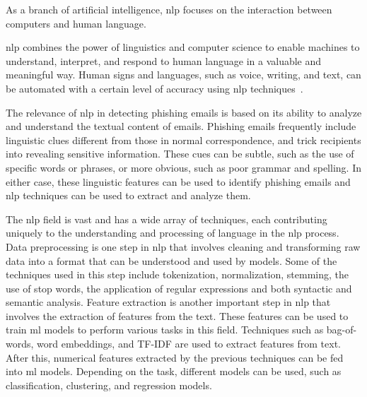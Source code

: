 
As a branch of artificial intelligence, \ac{nlp} focuses on the interaction between computers and human language.

\ac{nlp} combines the power of linguistics and computer science to enable machines to understand, interpret, and respond to human language in a valuable and meaningful way. Human signs and languages, such as voice, writing, and text, can be automated with a certain level of accuracy using \ac{nlp} techniques~\cite{Sathish20231612}.

The relevance of \ac{nlp} in detecting phishing emails is based on its ability to analyze and understand the textual content of emails. Phishing emails frequently include linguistic clues different from those in normal correspondence, and trick recipients into revealing sensitive information. These cues can be subtle, such as the use of specific words or phrases, or more obvious, such as poor grammar and spelling. In either case, these linguistic features can be used to identify phishing emails and \ac{nlp} techniques can be used to extract and analyze them.

The \ac{nlp} field is vast and has a wide array of techniques, each contributing uniquely to the understanding and processing of language in the \ac{nlp} process. Data preprocessing is one step in \ac{nlp} that involves cleaning and transforming raw data into a format that can be understood and used by models. Some of the techniques used in this step include tokenization, normalization, stemming, the use of stop words, the application of regular expressions and both syntactic and semantic analysis.
Feature extraction is another important step in \ac{nlp} that involves the extraction of features from the text. These features can be used to train \ac{ml} models to perform various tasks in this field. Techniques such as bag-of-words, word embeddings, and TF-IDF are used to extract features from text.
After this, numerical features extracted by the previous techniques can be fed into \ac{ml} models. Depending on the task, different models can be used, such as classification, clustering, and regression models.

